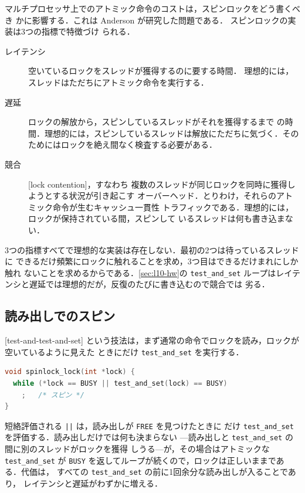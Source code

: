 \documentclass[../main.tex]{subfiles}
\begin{document}
マルチプロセッサ上でのアトミック命令のコストは，スピンロックをどう書くべき
かに影響する．これは Anderson \cite{anderson1990} が研究した問題である．%
スピンロックの実装は3つの指標で特徴づけ
られる．
\begin{description}
  \item[レイテンシ] 空いているロックをスレッドが獲得するのに要する時間．
    理想的には，スレッドはただちにアトミック命令を実行する．
  \item[遅延] ロックの解放から，スピンしているスレッドがそれを獲得するまで
    の時間．理想的には，スピンしているスレッドは解放にただちに気づく．その
    ためにはロックを絶え間なく検査する必要がある．
  \item[競合] [lock contention]，すなわち
    複数のスレッドが同じロックを同時に獲得しようとする状況が引き起こす
    オーバーヘッド．とりわけ，それらのアトミック命令が生むキャッシュ一貫性
    トラフィックである．理想的には，ロックが保持されている間，スピンして
    いるスレッドは何も書き込まない．
\end{description}
3つの指標すべてで理想的な実装は存在しない．最初の2つは待っているスレッドに
できるだけ頻繁にロックに触れることを求め，3つ目はできるだけまれにしか触れ
ないことを求めるからである．\cref{sec:l10-hw}の \texttt{test\_and\_set}
ループはレイテンシと遅延では理想的だが，反復のたびに書き込むので競合では
劣る．

\subsection{読み出しでのスピン}

[test-and-test-and-set]%
という技法は，まず通常の命令でロックを読み，ロックが空いているように見えた
ときにだけ \texttt{test\_and\_set} を実行する．
\begin{lstlisting}[language=C, numbers=none]
void spinlock_lock(int *lock) {
  while (*lock == BUSY || test_and_set(lock) == BUSY)
    ;   /* スピン */
}
\end{lstlisting}
短絡評価される \texttt{||} は，読み出しが \texttt{FREE} を見つけたときに
だけ \texttt{test\_and\_set} を評価する．読み出しだけでは何も決まらない
---読み出しと \texttt{test\_and\_set} の間に別のスレッドがロックを獲得
しうる---が，その場合はアトミックな \texttt{test\_and\_set} が
\texttt{BUSY} を返してループが続くので，ロックは正しいままである．代価は，
すべての \texttt{test\_and\_set} の前に1回余分な読み出しが入ることであり，
レイテンシと遅延がわずかに増える．
\end{document}
